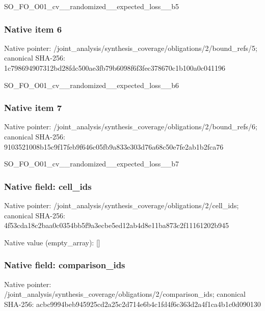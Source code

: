 \documentclass[10pt,a4paper]{article}
\begin{document}
\begingroup\raggedright\sloppy SO\_\allowbreak{}FO\_\allowbreak{}O01\_\allowbreak{}cv\_\allowbreak{}\_\allowbreak{}randomized\_\allowbreak{}\_\allowbreak{}expected\_\allowbreak{}loss\_\allowbreak{}\_\allowbreak{}b5\par\endgroup

\subsubsection{Native item 6}
Native pointer: /joint\_\allowbreak{}analysis/synthesis\_\allowbreak{}coverage/obligations/2/bound\_\allowbreak{}refs/5; canonical SHA-256: 1c798694907312bd28fdc500ae3fb79b6098f6f3fec378670c1b100a0c041196

\begingroup\raggedright\sloppy SO\_\allowbreak{}FO\_\allowbreak{}O01\_\allowbreak{}cv\_\allowbreak{}\_\allowbreak{}randomized\_\allowbreak{}\_\allowbreak{}expected\_\allowbreak{}loss\_\allowbreak{}\_\allowbreak{}b6\par\endgroup

\subsubsection{Native item 7}
Native pointer: /joint\_\allowbreak{}analysis/synthesis\_\allowbreak{}coverage/obligations/2/bound\_\allowbreak{}refs/6; canonical SHA-256: 9103521008b15c9f17feb9f646c05fb9a833e303d76a68c50e7fe2ab1b2fca76

\begingroup\raggedright\sloppy SO\_\allowbreak{}FO\_\allowbreak{}O01\_\allowbreak{}cv\_\allowbreak{}\_\allowbreak{}randomized\_\allowbreak{}\_\allowbreak{}expected\_\allowbreak{}loss\_\allowbreak{}\_\allowbreak{}b7\par\endgroup

\subsubsection{Native field: cell\_\allowbreak{}ids}
Native pointer: /joint\_\allowbreak{}analysis/synthesis\_\allowbreak{}coverage/obligations/2/cell\_\allowbreak{}ids; canonical SHA-256: 4f53cda18c2baa0c0354bb5f9a3ecbe5ed12ab4d8e11ba873c2f11161202b945

Native value (empty\_\allowbreak{}array): []

\subsubsection{Native field: comparison\_\allowbreak{}ids}
Native pointer: /joint\_\allowbreak{}analysis/synthesis\_\allowbreak{}coverage/obligations/2/comparison\_\allowbreak{}ids; canonical SHA-256: acbc9994beb945925cd2a25c2d714e6b4c1fd4f6c363d2a4f1ca4b1c0d090130
\end{document}
